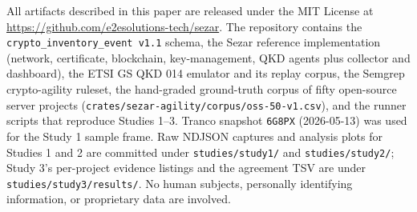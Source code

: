 All artifacts described in this paper are released under the MIT License
at \url{https://github.com/e2esolutions-tech/sezar}. The repository
contains the \texttt{crypto\_inventory\_event\ v1.1} schema, the Sezar
reference implementation (network, certificate, blockchain,
key-management, QKD agents plus collector and dashboard), the ETSI GS
QKD 014 emulator and its replay corpus, the Semgrep crypto-agility
ruleset, the hand-graded ground-truth corpus of fifty open-source server
projects (\texttt{crates/sezar-agility/corpus/oss-50-v1.csv}), and the
runner scripts that reproduce Studies 1--3. Tranco snapshot
\texttt{6G8PX} (2026-05-13) was used for the Study 1 sample frame. Raw
NDJSON captures and analysis plots for Studies 1 and 2 are committed
under \texttt{studies/study1/} and \texttt{studies/study2/}; Study 3's
per-project evidence listings and the agreement TSV are under
\texttt{studies/study3/results/}. No human subjects, personally
identifying information, or proprietary data are involved.

